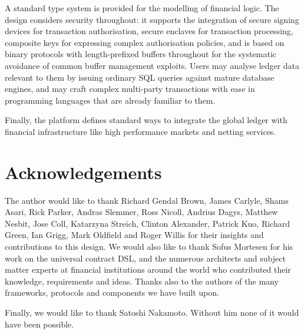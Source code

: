 \documentclass{article}
\begin{document}
A standard type system is provided for the modelling of financial logic. The design considers security throughout: it
supports the integration of secure signing devices for transaction authorisation, secure enclaves for transaction
processing, composite keys for expressing complex authorisation policies, and is based on binary protocols with
length-prefixed buffers throughout for the systematic avoidance of common buffer management exploits. Users may analyse
ledger data relevant to them by issuing ordinary SQL queries against mature database engines, and may craft complex
multi-party transactions with ease in programming languages that are already familiar to them.

Finally, the platform defines standard ways to integrate the global ledger with financial infrastructure like high
performance markets and netting services.

\section{Acknowledgements}

The author would like to thank Richard Gendal Brown, James Carlyle, Shams Asari, Rick Parker, Andras Slemmer, Ross
Nicoll, Andrius Dagys, Matthew Nesbit, Jose Coll, Katarzyna Streich, Clinton Alexander, Patrick Kuo, Richard Green, Ian
Grigg, Mark Oldfield and Roger Willis for their insights and contributions to this design. We would also like to thank
Sofus Mortesen for his work on the universal contract DSL, and the numerous architects and subject matter experts
at financial institutions around the world who contributed their knowledge, requirements and ideas. Thanks also to
the authors of the many frameworks, protocols and components we have built upon.

Finally, we would like to thank Satoshi Nakamoto. Without him none of it would have been possible.



\end{document}

